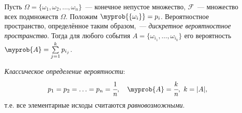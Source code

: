 \begin{defn}
    Пусть $\Omega = \{\omega_1, \omega_2, \ldots, \omega_n\}$~--- конечное непустое множество, $\mathcal{F}$~--- множество всех подмножеств $\Omega$. Положим $\myprob{\{\omega_i\}} = p_i$. Вероятностное пространство, определённое таким образом,~--- {\it дискретное вероятностное пространство}. Тогда для любого события $A = \{\omega_{i_1}, \ldots, \omega_{i_k}\}$ его вероятность $\myprob{A} = \sum\limits_{j=1}^k p_{i_j}$.
\end{defn}

\begin{defn}
    {\it Классическое определение вероятности}:
    \begin{equation*}
        p_1 = p_2 = \ldots =p_n=\cfrac{1}{n}, \quad \myprob{A} = \cfrac{k}{n},~ k=|A|,
    \end{equation*}
    т.е. все элементарные исходы считаются {\it равновозможными}.
\end{defn}
